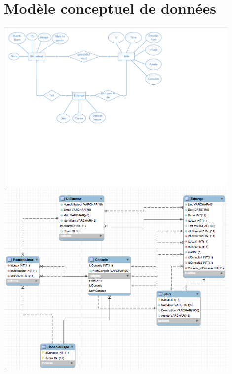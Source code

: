 \documentclass[a4paper,12pt,abstracton,titlepage]{scrartcl}
\begin{document}
\section{Modèle conceptuel de données}
\begin{minipage}[c]{\textwidth}
\centering
\includegraphics[width=0.9\textwidth, trim=5mm 83mm 80mm 5mm, clip]{./doc/E-R-Diagrammme.pdf}
\label{img:er}
\vspace{5mm}
\includegraphics[width=0.9\textwidth, trim=2mm 0mm 2mm 5mm, clip]{./doc/modelBDD.png}
\label{img:mcd}
\end{minipage}
\end{document}
